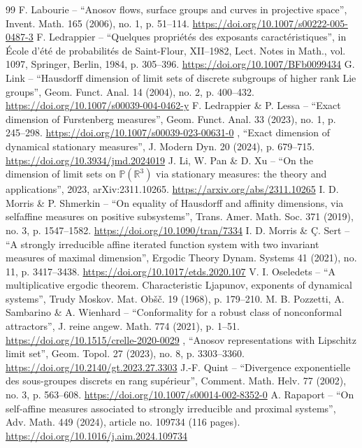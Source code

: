 \documentclass[10pt,a4paper]{amsart}
\begin{document}
\begin{thebibliography}{99}
 F. Labourie – “Anosov flows, surface groups and curves in projective space”, Invent. Math. 165 (2006), no. 1, p. 51–114. \url{https://doi.org/10.1007/s00222-005-0487-3}
 F. Ledrappier – “Quelques propriétés des exposants caractéristiques”, in École d’été de probabilités de Saint-Flour, XII–1982, Lect. Notes in Math., vol. 1097, Springer, Berlin, 1984, p. 305–396. \url{https://doi.org/10.1007/BFb0099434}
 G. Link – “Hausdorff dimension of limit sets of discrete subgroups of higher rank Lie groups”, Geom. Funct. Anal. 14 (2004), no. 2, p. 400–432. \url{https://doi.org/10.1007/s00039-004-0462-y}
 F. Ledrappier \& P. Lessa – “Exact dimension of Furstenberg measures”, Geom. Funct. Anal. 33 (2023), no. 1, p. 245–298. \url{https://doi.org/10.1007/s00039-023-00631-0}
 \textemdash{}, “Exact dimension of dynamical stationary measures”, J. Modern Dyn. 20 (2024), p. 679–715. \url{https://doi.org/10.3934/jmd.2024019}
 J. Li, W. Pan \& D. Xu – “On the dimension of limit sets on $\mathbb{P} (\mathbb{R}^3)$ via stationary measures: the theory and applications”, 2023, arXiv:2311.10265. \url{https://arxiv.org/abs/2311.10265}
 I. D. Morris \& P. Shmerkin – “On equality of Hausdorff and affinity dimensions, via selfaffine measures on positive subsystems”, Trans. Amer. Math. Soc. 371 (2019), no. 3, p. 1547–1582. \url{https://doi.org/10.1090/tran/7334}
 I. D. Morris \& Ç. Sert – “A strongly irreducible affine iterated function system with two invariant measures of maximal dimension”, Ergodic Theory Dynam. Systems 41 (2021), no. 11, p. 3417–3438. \url{https://doi.org/10.1017/etds.2020.107}
 V. I. Oseledets – “A multiplicative ergodic theorem. Characteristic Ljapunov, exponents of dynamical systems”, Trudy Moskov. Mat. Obšč. 19 (1968), p. 179–210. 
 M. B. Pozzetti, A. Sambarino \& A. Wienhard – “Conformality for a robust class of nonconformal attractors”, J. reine angew. Math. 774 (2021), p. 1–51. \url{https://doi.org/10.1515/crelle-2020-0029}
 \textemdash{}, “Anosov representations with Lipschitz limit set”, Geom. Topol. 27 (2023), no. 8, p. 3303–3360. \url{https://doi.org/10.2140/gt.2023.27.3303}
 J.-F. Quint – “Divergence exponentielle des sous-groupes discrets en rang supérieur”, Comment. Math. Helv. 77 (2002), no. 3, p. 563–608. \url{https://doi.org/10.1007/s00014-002-8352-0}
 A. Rapaport – “On self-affine measures associated to strongly irreducible and proximal systems”, Adv. Math. 449 (2024), article no. 109734 (116 pages). \url{https://doi.org/10.1016/j.aim.2024.109734}

\end{thebibliography}
\end{document}
